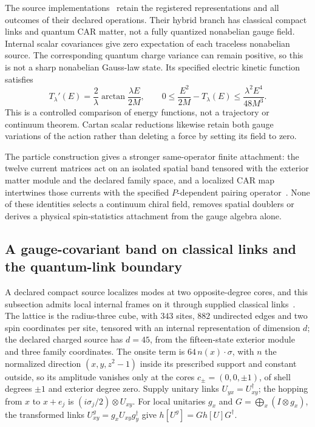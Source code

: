 \documentclass[11pt]{article}
\begin{document}
The source implementations~\cite{ophrepo} retain the registered representations
and all outcomes of their declared operations. Their hybrid branch has
classical compact links and quantum CAR matter, not a fully quantized
nonabelian gauge field. Internal scalar covariances give zero expectation
of each traceless nonabelian source. The corresponding quantum charge
variance can remain positive, so this is not a sharp nonabelian Gauss-law
state. Its specified electric kinetic function satisfies
\[
 T_\lambda'(E)=\frac2\lambda\arctan\frac{\lambda E}{2M},\qquad
 0\leq\frac{E^2}{2M}-T_\lambda(E)
 \leq\frac{\lambda^2E^4}{48M^3}.
\]
This is a controlled comparison of energy functions, not a trajectory or
continuum theorem. Cartan scalar reductions likewise retain both gauge
variations of the action rather than deleting a force by setting its field
to zero.

The particle construction gives a stronger same-operator finite attachment: the twelve
current matrices act on an isolated spatial band tensored with the exterior matter module
and the declared family space, and a localized CAR map intertwines those currents with
the specified $P$-dependent pairing operator~\cite{ophparticles}. None of these identities
selects a continuum chiral field, removes spatial doublers or derives a physical
spin-statistics attachment from the gauge algebra alone.



\subsection{A gauge-covariant band on classical links and the quantum-link boundary}
\label{sec:gauge-band}

A declared compact source localizes modes at two opposite-degree cores, and
this subsection admits local internal frames on it through supplied classical
links~\cite{ophrepo}. The lattice is the radius-three cube, with
\(343\) sites, \(882\) undirected edges and two spin coordinates per site, tensored with an
internal representation of dimension \(d\); the declared charged source has \(d=45\), from the
fifteen-state exterior module and three family coordinates. The onsite term is
\(64\,n(x)\cdot\sigma\), with \(n\) the normalized direction \((x,y,z^2-1)\) inside its
prescribed support and constant outside, so its amplitude vanishes only at the cores
\(c_\pm=(0,0,\pm1)\), of shell degrees \(\pm1\) and exterior degree zero. Supply unitary
links \(U_{yx}=U_{xy}^\dagger\); the hopping from \(x\) to \(x+e_j\) is
\((i\sigma_j/2)\otimes U_{xy}\). For local unitaries \(g_x\) and
\(G=\bigoplus_x(I\otimes g_x)\), the transformed links \(U^g_{xy}=g_xU_{xy}g_y^\dagger\) give
\(h[U^g]=Gh[U]G^\dagger\).
\end{document}

